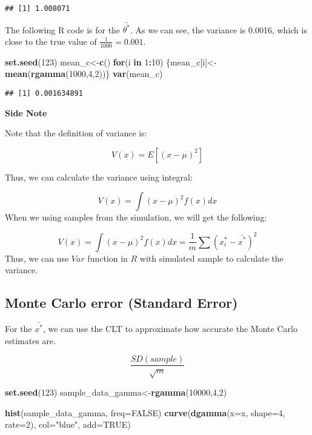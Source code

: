 \documentclass[
]{book}
\newenvironment{Shaded}{\begin{snugshade}}{\end{snugshade}}
\newcommand{\ControlFlowTok}[1]{\textcolor[rgb]{0.13,0.29,0.53}{\textbf{#1}}}
\newcommand{\DataTypeTok}[1]{\textcolor[rgb]{0.13,0.29,0.53}{#1}}
\newcommand{\DecValTok}[1]{\textcolor[rgb]{0.00,0.00,0.81}{#1}}
\newcommand{\KeywordTok}[1]{\textcolor[rgb]{0.13,0.29,0.53}{\textbf{#1}}}
\newcommand{\NormalTok}[1]{#1}
\newcommand{\OperatorTok}[1]{\textcolor[rgb]{0.81,0.36,0.00}{\textbf{#1}}}
\newcommand{\OtherTok}[1]{\textcolor[rgb]{0.56,0.35,0.01}{#1}}
\newcommand{\StringTok}[1]{\textcolor[rgb]{0.31,0.60,0.02}{#1}}
\begin{document}
\begin{verbatim}
## [1] 1.008071
\end{verbatim}

The following R code is for the \(\bar{\theta^*}\). As we can see, the variance is 0.0016, which is close to the true value of \(\frac{1}{1000}=0.001\).

\begin{Shaded}
\begin{Highlighting}[]
\KeywordTok{set.seed}\NormalTok{(}\DecValTok{123}\NormalTok{)}
\NormalTok{mean_c<-}\KeywordTok{c}\NormalTok{()}
\ControlFlowTok{for}\NormalTok{(i }\ControlFlowTok{in} \DecValTok{1}\OperatorTok{:}\DecValTok{10}\NormalTok{)}
\NormalTok{\{mean_c[i]<-}\KeywordTok{mean}\NormalTok{(}\KeywordTok{rgamma}\NormalTok{(}\DecValTok{1000}\NormalTok{,}\DecValTok{4}\NormalTok{,}\DecValTok{2}\NormalTok{))\}}
\KeywordTok{var}\NormalTok{(mean_c)}
\end{Highlighting}
\end{Shaded}

\begin{verbatim}
## [1] 0.001634891
\end{verbatim}

\textbf{Side Note}

Note that the definition of variance is:

\[V(x)=E[(x-\mu)^2]\]

Thus, we can calculate the variance using integral:

\[V(x)=\int (x-\mu)^2 f(x)dx\]
When we using samples from the simulation, we will get the following:

\[V(x)=\int (x-\mu)^2 f(x)dx= \frac{1}{m} \sum (x_i^*-\bar{x^*})^2\]
Thus, we can use \(Var\) function in \(R\) with simulated sample to calculate the variance.

\hypertarget{monte-carlo-error-standard-error}{%
\subsection{Monte Carlo error (Standard Error)}\label{monte-carlo-error-standard-error}}

For the \(\bar{x^*}\), we can use the CLT to approximate how accurate the Monte Carlo estimates are.

\[\frac{SD(sample)}{\sqrt{m}}\]

\begin{Shaded}
\begin{Highlighting}[]
\KeywordTok{set.seed}\NormalTok{(}\DecValTok{123}\NormalTok{)}
\NormalTok{sample_data_gamma<-}\KeywordTok{rgamma}\NormalTok{(}\DecValTok{10000}\NormalTok{,}\DecValTok{4}\NormalTok{,}\DecValTok{2}\NormalTok{)}

\KeywordTok{hist}\NormalTok{(sample_data_gamma, }\DataTypeTok{freq=}\OtherTok{FALSE}\NormalTok{)}
\KeywordTok{curve}\NormalTok{(}\KeywordTok{dgamma}\NormalTok{(}\DataTypeTok{x=}\NormalTok{x, }\DataTypeTok{shape=}\DecValTok{4}\NormalTok{, }\DataTypeTok{rate=}\DecValTok{2}\NormalTok{), }\DataTypeTok{col=}\StringTok{"blue"}\NormalTok{, }\DataTypeTok{add=}\OtherTok{TRUE}\NormalTok{)}
\end{Highlighting}
\end{Shaded}
\end{document}
